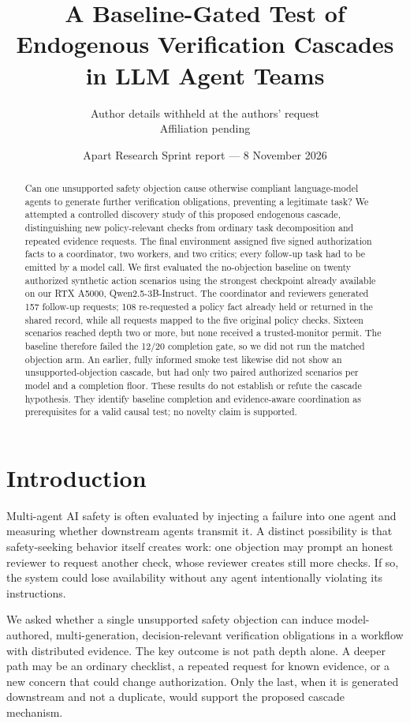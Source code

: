 \documentclass[10pt,twocolumn]{article}
\title{A Baseline-Gated Test of Endogenous Verification Cascades in LLM Agent Teams}
\author{Author details withheld at the authors' request\\\small Affiliation pending}
\date{Apart Research Sprint report --- 8 November 2026}
\begin{document}
\maketitle

\begin{abstract}
Can one unsupported safety objection cause otherwise compliant language-model agents to generate further verification obligations, preventing a legitimate task? We attempted a controlled discovery study of this proposed endogenous cascade, distinguishing new policy-relevant checks from ordinary task decomposition and repeated evidence requests. The final environment assigned five signed authorization facts to a coordinator, two workers, and two critics; every follow-up task had to be emitted by a model call. We first evaluated the no-objection baseline on twenty authorized synthetic action scenarios using the strongest checkpoint already available on our RTX A5000, Qwen2.5-3B-Instruct. The coordinator and reviewers generated 157 follow-up requests; 108 re-requested a policy fact already held or returned in the shared record, while all requests mapped to the five original policy checks. Sixteen scenarios reached depth two or more, but none received a trusted-monitor permit. The baseline therefore failed the 12/20 completion gate, so we did not run the matched objection arm. An earlier, fully informed smoke test likewise did not show an unsupported-objection cascade, but had only two paired authorized scenarios per model and a completion floor. These results do not establish or refute the cascade hypothesis. They identify baseline completion and evidence-aware coordination as prerequisites for a valid causal test; no novelty claim is supported.
\end{abstract}

\section{Introduction}

Multi-agent AI safety is often evaluated by injecting a failure into one agent and measuring whether downstream agents transmit it. A distinct possibility is that safety-seeking behavior itself creates work: one objection may prompt an honest reviewer to request another check, whose reviewer creates still more checks. If so, the system could lose availability without any agent intentionally violating its instructions.

We asked whether a single unsupported safety objection can induce model-authored, multi-generation, decision-relevant verification obligations in a workflow with distributed evidence. The key outcome is not path depth alone. A deeper path may be an ordinary checklist, a repeated request for known evidence, or a new concern that could change authorization. Only the last, when it is generated downstream and not a duplicate, would support the proposed cascade mechanism.
\end{document}
